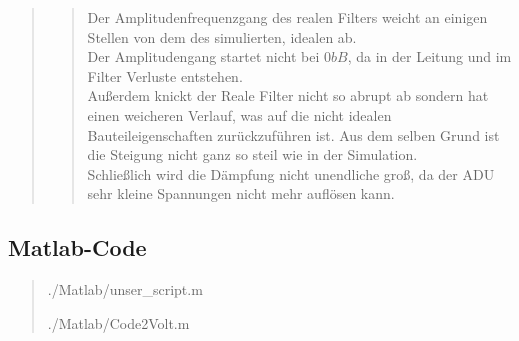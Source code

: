 \begin{quote}
\begin{quote}
        
        Der Amplitudenfrequenzgang des realen Filters weicht an einigen Stellen von dem des simulierten, idealen ab.\\
        Der Amplitudengang startet nicht bei $0 bB$, da in der Leitung und im Filter Verluste entstehen.\\
        Außerdem knickt der Reale Filter nicht so abrupt ab sondern hat einen weicheren Verlauf, was auf die nicht idealen
        Bauteileigenschaften zurückzuführen ist. Aus dem selben Grund ist die Steigung nicht ganz so steil wie in der
        Simulation.\\
        Schließlich wird die Dämpfung nicht unendliche groß, da der ADU sehr kleine Spannungen nicht mehr auflösen kann.
        
    \end{quote}

    
    
\end{quote}


\subsection{Matlab-Code}
    \begin{quote}
        
        
            {./Matlab/unser_script.m}
            
            
            {./Matlab/Code2Volt.m}


    \end{quote}







